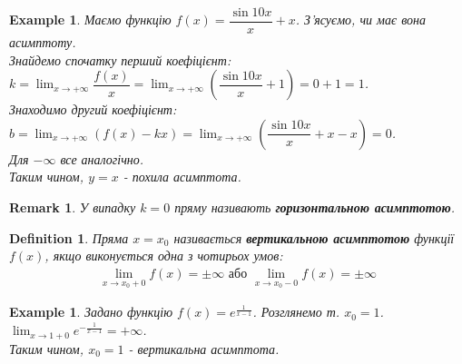 \documentclass[a4paper, 14pt]{article}
\theoremstyle{theoremdd}
\theoremstyle{theoremdd}
\newtheorem{definition}[theorem]{Definition}
\theoremstyle{theoremdd}
\theoremstyle{theoremdd}
\newtheorem{example}[theorem]{Example}
\theoremstyle{theoremdd}
\theoremstyle{theoremdd}
\newtheorem{remark}[theorem]{Remark}
\theoremstyle{theoremdd}
\theoremstyle{theoremdd}
\begin{document}
\begin{example}
Маємо функцію $f(x) = \dfrac{\sin 10 x}{x} + x$. З'ясуємо, чи має вона асимптоту.\\
Знайдемо спочатку перший коефіцієнт:\\
$k = \displaystyle\lim_{x \to +\infty} \dfrac{f(x)}{x} = \lim_{x \to +\infty} \left( \dfrac{\sin 10 x}{x} + 1 \right) = 0 + 1 = 1$.\\
Знаходимо другий коефіцієнт:\\
$b = \displaystyle\lim_{x \to +\infty} (f(x) - kx) = \lim_{x \to +\infty} \left( \dfrac{\sin 10 x}{x} + x - x \right) = 0$.\\
\textit{Для $-\infty$ все аналогічно.}\\
Таким чином, $y = x$ - похила асимптота.
\begin{figure}[H]
\centering
{}
\end{figure}
\end{example}

\begin{remark}
У випадку $k = 0$ пряму називають \textbf{горизонтальною асимптотою}.
\end{remark}

\begin{definition}
Пряма $x = x_0$ називається \textbf{вертикальною асимптотою} функції $f(x)$, якщо виконується одна з чотирьох умов:
\begin{align*}
\lim_{x \to x_0 + 0} f(x) = \pm \infty \text{ або } \lim_{x \to x_0 - 0} f(x) = \pm \infty
\end{align*}
\end{definition}

\begin{example}
Задано функцію $f(x) = e^{\frac{1}{x-1}}$. Розглянемо т. $x_0 = 1$.\\
$\displaystyle \lim_{x \to 1+0} e^{-\frac{1}{x-1}} = +\infty$.\\
Таким чином, $x_0 = 1$ - вертикальна асимптота.
\begin{figure}[H]
\centering
{}
\end{figure}
\end{example}
\end{document}
